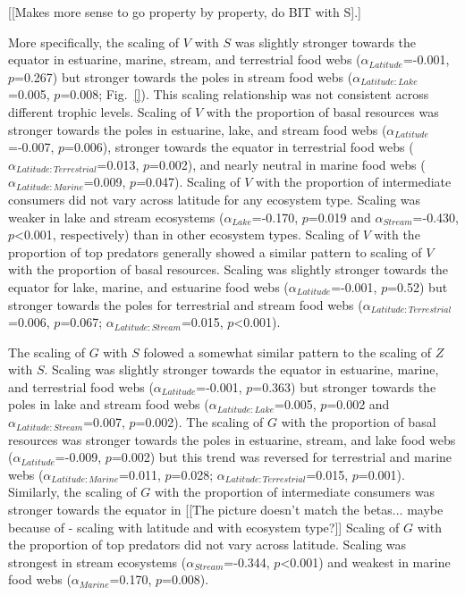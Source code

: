 \documentclass[12pt]{article}
\begin{document}
[[Makes more sense to go property by property, do BIT with S].]

More specifically, the scaling of $V$ with $S$ was slightly stronger towards
the equator in estuarine, marine, stream, and terrestrial food webs
($\alpha_{Latitude}$=-0.001, $p$=0.267) but stronger towards the poles in
stream food webs ($\alpha_{Latitude:Lake}$=0.005, $p$=0.008; Fig.~\ref{}).
This scaling relationship was not consistent across different trophic levels.
Scaling of $V$ with the proportion of basal resources was  stronger towards
the poles in estuarine, lake, and stream food webs
($\alpha_{Latitude}$=-0.007, $p$=0.006),  stronger towards the equator in
terrestrial food webs ($\alpha_{Latitude:Terrestrial}$=0.013, $p$=0.002), and
nearly neutral in marine food webs ($\alpha_{Latitude:Marine}$=0.009,
$p$=0.047).  Scaling of $V$ with the proportion of intermediate consumers did
not vary across latitude for any ecosystem type.  Scaling was weaker in lake
and stream ecosystems ($\alpha_{Lake}$=-0.170, $p$=0.019 and
$\alpha_{Stream}$=-0.430, $p$\textless0.001, respectively) than in other
ecosystem types. Scaling of $V$ with the proportion of top predators generally
showed a similar pattern to scaling of $V$ with the proportion of basal
resources. Scaling was slightly stronger towards the equator for lake, marine,
and estuarine food webs ($\alpha_{Latitude}$=-0.001, $p$=0.52) but stronger
towards the poles for terrestrial and stream food webs
($\alpha_{Latitude:Terrestrial}$=0.006, $p$=0.067;
$\alpha_{Latitude:Stream}$=0.015, $p$\textless0.001).


The scaling of $G$ with $S$ folowed a somewhat similar pattern to the scaling
of $Z$ with $S$.  Scaling was slightly stronger towards the equator in
estuarine, marine, and terrestrial food webs ($\alpha_{Latitude}$=-0.001,
$p$=0.363) but stronger towards the poles in lake and stream food webs
($\alpha_{Latitude:Lake}$=0.005, $p$=0.002 and
$\alpha_{Latitude:Stream}$=0.007, $p$=0.002).  The scaling of $G$ with the
proportion of basal resources was stronger towards the poles in estuarine,
stream, and lake food webs ($\alpha_{Latitude}$=-0.009, $p$=0.002) but this
trend was reversed for terrestrial and marine webs
($\alpha_{Latitude:Marine}$=0.011, $p$=0.028;
$\alpha_{Latitude:Terrestrial}$=0.015, $p$=0.001). Similarly, the scaling of
$G$ with the proportion of intermediate consumers was stronger towards the
equator in [[The picture doesn't match the betas... maybe because of - scaling
with latitude and with ecosystem type?]] Scaling of $G$ with the proportion of
top predators did not vary across latitude. Scaling was strongest in stream
ecosystems ($\alpha_{Stream}$=-0.344, $p$\textless0.001) and weakest in marine
food webs ($\alpha_{Marine}$=0.170, $p$=0.008).
\end{document}
